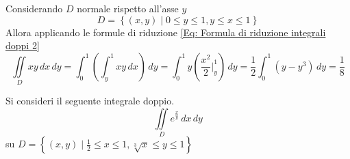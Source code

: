 \begin{example}
\begin{equation*}
    \end{equation*}
    Considerando $D$ normale rispetto all'asse $y$
    \begin{equation*}
        D= \left\{(x,y) \mid 0 \leq y \leq 1, y \leq x \leq 1 \right\}
    \end{equation*}
    Allora applicando le formule di riduzione \eqref{Eq: Formula di riduzione integrali doppi 2}
    \begin{equation*}
        \iint\limits_D{xy}\,dx\,dy= \int_{0}^{1}{\left(\int_{y}^{1}{xy\,dx}\right)}\,dy = \int_{0}^{1}{y\left( \frac{x^2}{2}\Big|_{y}^1 \right)}\,dy= \frac{1}{2}\int_{0}^{1}{\left(y-y^3\right)}\,dy= \frac{1}{8}
    \end{equation*}
\end{example}
\begin{example}[TO-DO]
    Si consideri il seguente integrale doppio.
    \begin{equation*}
    \iint\limits_D e^\frac{x}{y}\, dx\,dy    
    \end{equation*}
    su $D=\left\{ (x,y) \mid \frac{1}{2} \leq x \leq 1, \sqrt[3]{x} \leq y \leq 1\right\}$
\end{example}

